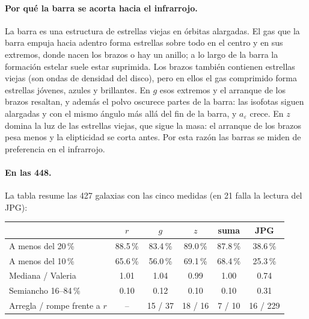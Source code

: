 \documentclass[11pt,a4paper]{article}
\newcommand{\aeps}{a_\varepsilon}
\begin{document}
\paragraph{Por qué la barra se acorta hacia el infrarrojo.} La barra es una estructura de estrellas viejas en
órbitas alargadas. El gas que la barra empuja hacia adentro forma estrellas sobre todo en el centro y en sus
extremos, donde nacen los brazos o hay un anillo; a lo largo de la barra la formación estelar suele estar
suprimida. Los brazos también contienen estrellas viejas (son ondas de densidad del disco), pero en ellos el gas
comprimido forma estrellas jóvenes, azules y brillantes. En $g$ esos extremos y el arranque de los brazos
resaltan, y además el polvo oscurece partes de la barra: las isofotas siguen alargadas y con el mismo ángulo más
allá del fin de la barra, y $\aeps$ crece. En $z$ domina la luz de las estrellas viejas, que sigue la masa: el
arranque de los brazos pesa menos y la elipticidad se corta antes. Por esta razón las barras se miden de
preferencia en el infrarrojo.

\paragraph{En las 448.} La tabla resume las 427 galaxias con las cinco medidas (en 21 falla la lectura del JPG):

\begin{center}
\begin{tabular}{lccccc}
\toprule
 & $r$ & $g$ & $z$ & suma & JPG \\
\midrule
A menos del 20\,\% & 88.5\,\% & 83.4\,\% & 89.0\,\% & 87.8\,\% & 38.6\,\% \\
A menos del 10\,\% & 65.6\,\% & 56.0\,\% & 69.1\,\% & 68.4\,\% & 25.3\,\% \\
Mediana / Valeria & 1.01 & 1.04 & 0.99 & 1.00 & 0.74 \\
Semiancho 16--84\,\% & 0.10 & 0.12 & 0.10 & 0.10 & 0.31 \\
Arregla / rompe frente a $r$ & -- & 15 / 37 & 18 / 16 & 7 / 10 & 16 / 229 \\
\bottomrule
\end{tabular}
\end{center}
\end{document}
